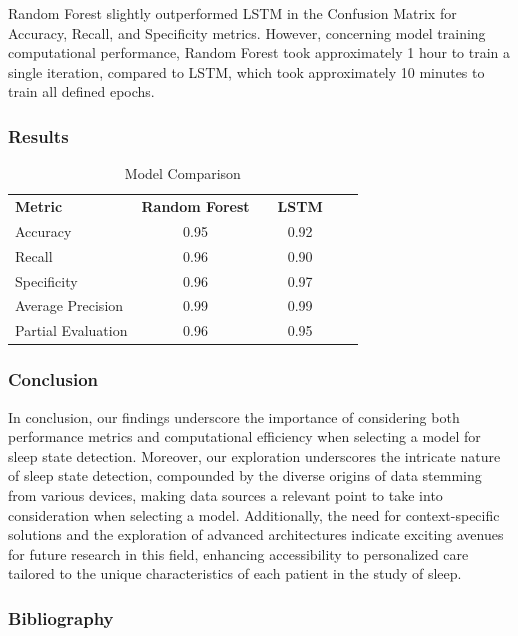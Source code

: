 \documentclass[10pt]{beamer}
\begin{document}
\begin{frame}
    \begin{block}{}
        Random Forest slightly outperformed LSTM in the Confusion Matrix for Accuracy, Recall, and Specificity metrics. However, concerning model training computational performance, Random Forest took approximately 1 hour to train a single iteration, compared to LSTM, which took approximately 10 minutes to train all defined epochs.
    \end{block}
    \frametitle{Results}
    \begin{block}{}
        \begin{table}[h]
            \centering
            \caption{Model Comparison}
            \label{tab:model_comparison}
            \begin{tabular}{lccccc}
                \hline
                \textbf{Metric} & \textbf{Random Forest} & & \textbf{LSTM} & \\
                \cline{2-5}
                Accuracy & 0.95 & & 0.92 & \\
                Recall & 0.96 & & 0.90 & \\
                Specificity & 0.96 & & 0.97 & \\
                Average Precision & 0.99 & & 0.99 & \\
                Partial Evaluation & 0.96 & & 0.95 & \\
                \hline
            \end{tabular}
        \end{table}
    \end{block} 
\end{frame}

\begin{frame}
  \frametitle{Conclusion}
  \begin{block}{}
    In conclusion, our findings underscore the importance of considering both performance metrics and computational efficiency when selecting a model for sleep state detection. Moreover, our exploration underscores the intricate nature of sleep state detection, compounded by the diverse origins of data stemming from various devices, making data sources a relevant point to take into consideration when selecting a model. Additionally, the need for context-specific solutions and the exploration of advanced architectures indicate exciting avenues for future research in this field, enhancing accessibility to personalized care tailored to the unique characteristics of each patient in the study of sleep.
  \end{block} 
\end{frame}


\begin{frame}
  \frametitle{Bibliography}
  \begin{block}{}
    {
        \small
    }
  \end{block} 
\end{frame}
\end{document}
